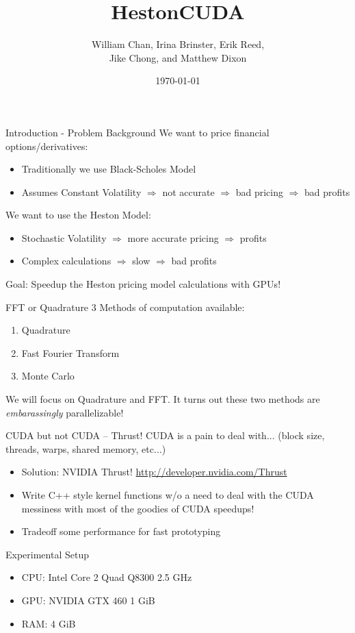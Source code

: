 \documentclass{beamer}
\title[Carnegie Mellon University]{HestonCUDA}
\author{William Chan, Irina Brinster, Erik Reed,\\Jike Chong, and Matthew Dixon}
\institute[\insertframenumber]{
  Carnegie Mellon University\\
  NASA AMES Research Park\\
  Moffett Field, California 94305\\
  \texttt{williamchan@cmu.edu}
}
\date{\today}
\begin{document}
\begin{frame}[plain]
  \titlepage
\end{frame}

\begin{frame}[t]{Introduction - Problem Background}
We want to price financial options/derivatives:
\begin{itemize}
\item Traditionally we use Black-Scholes Model
\item Assumes Constant Volatility $\Rightarrow$ not accurate $\Rightarrow$ bad pricing $\Rightarrow$ bad profits
\end{itemize}
We want to use the Heston Model:
\begin{itemize}
\item Stochastic Volatility $\Rightarrow$ more accurate pricing $\Rightarrow$ profits
\item Complex calculations $\Rightarrow$ slow $\Rightarrow$ bad profits
\end{itemize}
\vfill
Goal: Speedup the Heston pricing model calculations with GPUs!
\end{frame}

\begin{frame}[t]{FFT or Quadrature}
3 Methods of computation available:
\begin{enumerate}
\item Quadrature
\item Fast Fourier Transform
\item Monte Carlo
\end{enumerate}
\vfill
We will focus on Quadrature and FFT.
It turns out these two methods are \textit{embarassingly} parallelizable!
\end{frame}

\begin{frame}[t]{CUDA but not CUDA -- Thrust!}
CUDA is a pain to deal with... (block size, threads, warps, shared memory, etc...)
\begin{itemize}
\item Solution: NVIDIA Thrust! \url{http://developer.nvidia.com/Thrust}
\item Write C++ style kernel functions w/o a need to deal with the CUDA messiness with most of the goodies of CUDA speedups!
\item Tradeoff some performance for fast prototyping
\end{itemize}
\end{frame}

\begin{frame}[t]{Experimental Setup}
\begin{itemize}
\item CPU: Intel Core 2 Quad Q8300 2.5 GHz
\item GPU: NVIDIA GTX 460 1 GiB
\item RAM: 4 GiB
\end{itemize}
\end{frame}
\end{document}
